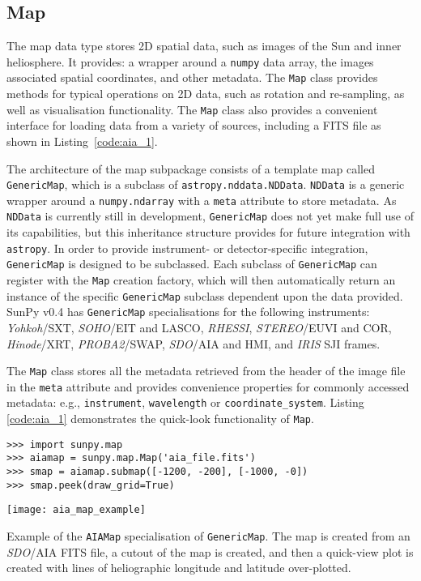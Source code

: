 \subsection{Map}\label{ssec:map}
The map data type stores 2D spatial data, such as images of the Sun and 
inner heliosphere. It provides: a wrapper around a \texttt{numpy} data array, 
the images associated spatial coordinates, and other metadata. The \texttt{Map} 
class provides methods for typical operations on 2D data, such as rotation and 
re-sampling, as well as visualisation functionality.
The \texttt{Map} class also provides a convenient interface for loading data 
from a variety of sources, including a FITS file as shown in 
Listing~\ref{code:aia_1}.

The architecture of the map subpackage consists of a template map called
\texttt{GenericMap}, which is a subclass of \texttt{astropy.nddata.NDData}. 
\texttt{NDData} is a generic wrapper around a \texttt{numpy.ndarray} with a 
\texttt{meta} attribute to store metadata.
As \texttt{NDData} is currently still in development, \texttt{GenericMap} does 
not yet make full use of its capabilities, but this inheritance structure 
provides for future integration with \texttt{astropy}. In order to provide 
instrument- or detector-specific integration, \texttt{GenericMap} is designed
to be subclassed. Each subclass of \texttt{GenericMap} can register 
with the \texttt{Map} creation factory, which will then automatically return an instance
of the specific \texttt{GenericMap} subclass dependent upon the data provided. 
SunPy v0.4 has \texttt{GenericMap} specialisations for the following 
instruments: 
\textit{Yohkoh}/SXT, \textit{SOHO}/EIT and LASCO, \textit{RHESSI}, 
\textit{STEREO}/EUVI and COR, \textit{Hinode}/XRT,
\textit{PROBA2}/SWAP, \textit{SDO}/AIA and HMI, 
and \textit{IRIS} SJI frames. 
                        
The \texttt{Map} class stores all the metadata retrieved from the header of 
the image file in the \texttt{meta} attribute and provides convenience 
properties for commonly accessed metadata: e.g., \texttt{instrument}, 
\texttt{wavelength} or \texttt{coordinate\_system}. 
Listing \ref{code:aia_1} demonstrates the quick-look functionality of 
\texttt{Map}.

\begin{listing}[H]
\begin{verbatim}
>>> import sunpy.map
>>> aiamap = sunpy.map.Map('aia_file.fits')
>>> smap = aiamap.submap([-1200, -200], [-1000, -0])
>>> smap.peek(draw_grid=True)
\end{verbatim}
\begin{center}
\texttt{[image: aia\_map\_example]}
\end{center}
\caption{Example of the \texttt{AIAMap} specialisation of 
\texttt{GenericMap}. The map is created from an \textit{SDO}/AIA FITS file, a cutout
of the map is created, and then a quick-view plot is created with lines of heliographic longitude and latitude over-plotted.}
\label{code:aia_1}
\end{listing}

